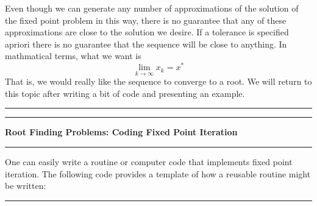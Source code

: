 \documentclass[10pt,fleqn]{article}
\begin{document}
Even though we can generate any number of approximations of the solution of the
fixed point problem in this way, there is no guarantee that any of these
approximations are close to the solution we desire. If a tolerance is specified
apriori there is no guarantee that the sequence will be close to anything. In
mathmatical terms, what we want is
$$
  \lim_{k\rightarrow\infty} x_k = x^*
$$
That is, we would really like the sequence to converge to a root. We will
return to this topic after writing a bit of code and presenting an example.
\vskip0.1in\hrule\vskip0.1in
\newpage
\vskip0.1in\hrule\vskip0.1in
\noindent
{\bf Root Finding Problems: Coding Fixed Point Iteration} 
\vskip0.1in\hrule\vskip0.1in
\noindent
One can easily write a routine or computer code that implements fixed point
iteration. The following code provides a template of how a reusable routine
might be written:
\vskip0.1in\hrule\vskip0.1in
\end{document}
